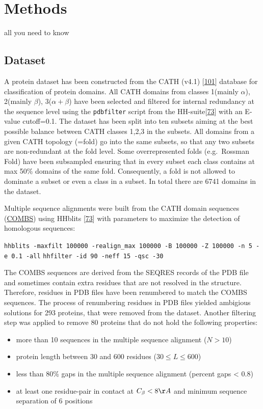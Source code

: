 \documentclass[12pt,a4paper,twoside]{book}
\providecommand{\tightlist}{%
  \setlength{\itemsep}{0pt}\setlength{\parskip}{0pt}}
\theoremstyle{definition}
\theoremstyle{definition}
\theoremstyle{remark}
\begin{document}
\chapter{Methods}\label{methods}

all you need to know

\section{Dataset}\label{dataset}

A protein dataset has been constructed from the CATH (v4.1)
{[}\protect\hyperlink{ref-Sillitoe2015}{101}{]} database for
classification of protein domains. All CATH domains from classes
1(mainly \(\alpha\)), 2(mainly \(\beta\)), 3(\(\alpha+\beta\)) have been
selected and filtered for internal redundancy at the sequence level
using the \texttt{pdbfilter} script from the
HH-suite{[}\protect\hyperlink{ref-Remmert2012}{73}{]} with an E-value
cutoff=0.1. The dataset has been split into ten subsets aiming at the
best possible balance between CATH classes 1,2,3 in the subsets. All
domains from a given CATH topology (=fold) go into the same subsets, so
that any two subsets are non-redundant at the fold level. Some
overrepresented folds (e.g.~Rossman Fold) have been subsampled ensuring
that in every subset each class contains at max 50\% domains of the same
fold. Consequently, a fold is not allowed to dominate a subset or even a
class in a subset. In total there are 6741 domains in the dataset.

Multiple sequence alignments were built from the CATH domain sequences
(\href{http://www.cathdb.info/version/current/domain/3cdjA03/sequence}{COMBS})
using HHblits {[}\protect\hyperlink{ref-Remmert2012}{73}{]} with
parameters to maximize the detection of homologous sequences:

\texttt{hhblits\ -maxfilt\ 100000\ -realign\_max\ 100000\ -B\ 100000\ -Z\ 100000\ -n\ 5\ -e\ 0.1\ -all}
\texttt{hhfilter\ -id\ 90\ -neff\ 15\ -qsc\ -30}

The COMBS sequences are derived from the SEQRES records of the PDB file
and sometimes contain extra residues that are not resolved in the
structure. Therefore, residues in PDB files have been renumbered to
match the COMBS sequences. The process of renumbering residues in PDB
files yielded ambigious solutions for 293 proteins, that were removed
from the dataset. Another filtering step was applied to remove 80
proteins that do not hold the following properties:

\begin{itemize}
\tightlist
\item
  more than 10 sequences in the multiple sequence alignment (\(N>10\))
\item
  protein length between 30 and 600 residues (\(30 \leq L \leq 600\))
\item
  less than 80\% gaps in the multiple sequence alignment (percent gaps
  \textless{} 0.8)
\item
  at least one residue-pair in contact at \(C_\beta < 8\AA\) and minimum
  sequence separation of 6 positions
\end{itemize}
\end{document}
